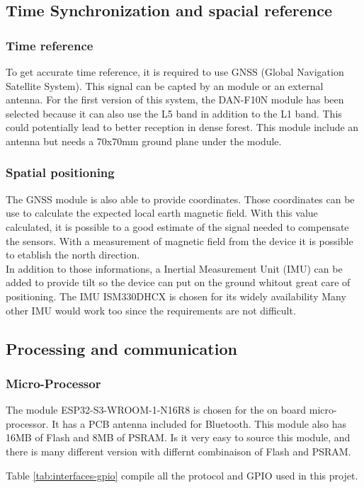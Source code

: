 \documentclass[11pt]{article}
\begin{document}
\subsection{Time Synchronization and spacial reference}
\subsubsection{Time reference}
To get accurate time reference, it is required to use GNSS (Global Navigation Satellite 
System). This signal can be capted by an module or an external antenna. For the first
version of this system, the DAN-F10N module has been selected because it can also use
the L5 band in addition to the L1 band. This could potentially lead to better reception
in dense forest. This module include an antenna but needs a 70x70mm ground plane under
the module. 
\subsubsection{Spatial positioning}
The GNSS module is also able to provide coordinates. Those coordinates can be use to 
calculate the expected local earth magnetic field. With this value calculated, it is
possible to a good estimate of the signal needed to compensate the sensors. With a 
measurement of magnetic field from the device it is possible to etablish the north 
direction. \\
In addition to those informations, a Inertial Measurement Unit (IMU) can be added 
to provide tilt so the device can put on the ground whitout great care of positioning.
The IMU ISM330DHCX is chosen for its widely availability Many other IMU would work 
too since the requirements are not difficult.

\subsection{Processing and communication}
\subsubsection{Micro-Processor}
The module ESP32-S3-WROOM-1-N16R8 is chosen for the on board micro-processor. It has a
PCB antenna included for Bluetooth. This module also has 16MB of Flash and 8MB of PSRAM.
Is it very easy to source this module, and there is many different version with differnt 
combinaison of Flash and PSRAM.

Table \ref{tab:interfaces-gpio} compile all the protocol and GPIO used in this projet.
\end{document}
